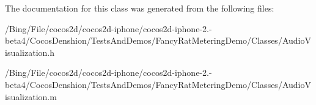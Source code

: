 The documentation for this class was generated from the following files\-:\begin{DoxyCompactItemize}
\item 
/\-Bing/\-File/cocos2d/cocos2d-\/iphone/cocos2d-\/iphone-\/2.-\/beta4/\-Cocos\-Denshion/\-Tests\-And\-Demos/\-Fancy\-Rat\-Metering\-Demo/\-Classes/Audio\-Visualization.\-h\item 
/\-Bing/\-File/cocos2d/cocos2d-\/iphone/cocos2d-\/iphone-\/2.-\/beta4/\-Cocos\-Denshion/\-Tests\-And\-Demos/\-Fancy\-Rat\-Metering\-Demo/\-Classes/Audio\-Visualization.\-m\end{DoxyCompactItemize}
